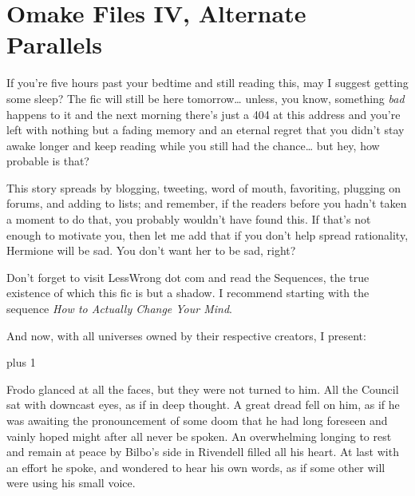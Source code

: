 
\makeatletter
\newcommand{\OmakeIVspecialsection}[2][1.5]{%
\vspace*{2\baselineskip plus 1\baselineskip minus 1\baselineskip}%
\noindent\hfill\scalebox{#1}{#2}\hfill\mbox{}%
\vskip 1\baselineskip plus 1\baselineskip%
\@afterindentfalse\@afterheading
}
\makeatother

\newcommand{\OmakeIVsection}[2][1.5]{%
  \OmakeIVspecialsection[#1]{\MakeUppercase{#2}}}

\chapter{Omake Files IV, Alternate Parallels}

\begin{chapterOpeningAuthorNote}
If you’re five hours past your bedtime and still reading this, may I suggest getting some sleep? The fic will still be here tomorrow… unless, you know, something \emph{bad} happens to it and the next morning there’s just a 404 at this address and you’re left with nothing but a fading memory and an eternal regret that you didn’t stay awake longer and keep reading while you still had the chance… but hey, how probable is that?

This story spreads by blogging, tweeting, word of mouth, favoriting, plugging on forums, and adding to lists; and remember, if the readers before you hadn’t taken a moment to do that, you probably wouldn’t have found this. If that’s not enough to motivate you, then let me add that if you don’t help spread rationality, Hermione will be sad. You don’t want her to be sad, right?

Don’t forget to visit LessWrong dot com and read the Sequences, the true existence of which this fic is but a shadow. I recommend starting with the sequence \emph{How to Actually Change Your Mind}.

And now, with all universes owned by their respective creators, I present:
\end{chapterOpeningAuthorNote}

\OmakeIVspecialsection[1.6]{\fontspec[ExternalLocation]{RingBearer}
\settowidth{\versewidth}{\mbox{the}} Lord\scalebox{.40}{\parbox[b]{\versewidth}{%
  \centering of\\
\nointerlineskip\vskip 4pt the}}Ratîonalît\raisebox{-.32ex}{Y}}

Frodo glanced at all the faces, but they were not turned to him. All the Council sat with downcast eyes, as if in deep thought. A great dread fell on him, as if he was awaiting the pronouncement of some doom that he had long foreseen and vainly hoped might after all never be spoken. An overwhelming longing to rest and remain at peace by Bilbo’s side in Rivendell filled all his heart. At last with an effort he spoke, and wondered to hear his own words, as if some other will were using his small voice.


